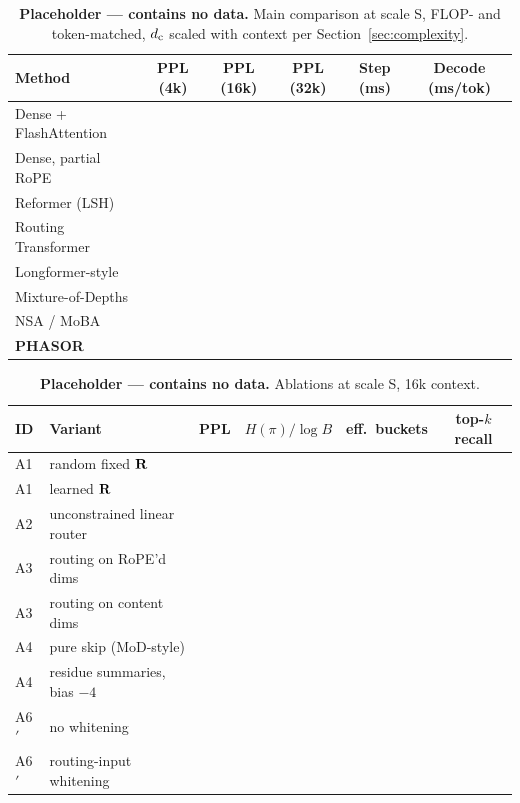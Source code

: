 \begin{table}[h]
\centering
\small
\begin{tabular}{lccccc}
\toprule
\textbf{Method} & \textbf{PPL (4k)} & \textbf{PPL (16k)} & \textbf{PPL (32k)} & \textbf{Step (ms)} & \textbf{Decode (ms/tok)} \\
\midrule
Dense + FlashAttention      & \TODO{--} & \TODO{--} & \TODO{--} & \TODO{--} & \TODO{--} \\
Dense, partial RoPE         & \TODO{--} & \TODO{--} & \TODO{--} & \TODO{--} & \TODO{--} \\
Reformer (LSH)              & \TODO{--} & \TODO{--} & \TODO{--} & \TODO{--} & \TODO{--} \\
Routing Transformer         & \TODO{--} & \TODO{--} & \TODO{--} & \TODO{--} & \TODO{--} \\
Longformer-style            & \TODO{--} & \TODO{--} & \TODO{--} & \TODO{--} & \TODO{--} \\
Mixture-of-Depths           & \TODO{--} & \TODO{--} & \TODO{--} & \TODO{--} & \TODO{--} \\
NSA / MoBA                  & \TODO{--} & \TODO{--} & \TODO{--} & \TODO{--} & \TODO{--} \\
\midrule
\textbf{PHASOR}             & \TODO{--} & \TODO{--} & \TODO{--} & \TODO{--} & \TODO{--} \\
\bottomrule
\end{tabular}
\caption{\textbf{Placeholder --- contains no data.} Main comparison at scale S, FLOP- and token-matched, $d_{\mathrm{c}}$ scaled with context per Section~\ref{sec:complexity}.}
\end{table}

\begin{table}[h]
\centering
\small
\begin{tabular}{llcccc}
\toprule
\textbf{ID} & \textbf{Variant} & \textbf{PPL} & \textbf{$H(\pi)/\log B$} & \textbf{eff.\ buckets} & \textbf{top-$k$ recall} \\
\midrule
A1 & random fixed $\mathbf{R}$              & \TODO{--} & \TODO{--} & \TODO{--} & \TODO{--} \\
A1 & learned $\mathbf{R}$                   & \TODO{--} & \TODO{--} & \TODO{--} & \TODO{--} \\
A2 & unconstrained linear router     & \TODO{--} & \TODO{--} & \TODO{--} & \TODO{--} \\
A3 & routing on RoPE'd dims          & \TODO{--} & \TODO{--} & \TODO{--} & \TODO{--} \\
A3 & routing on content dims         & \TODO{--} & \TODO{--} & \TODO{--} & \TODO{--} \\
A4 & pure skip (MoD-style)           & \TODO{--} & \TODO{--} & \TODO{--} & \TODO{--} \\
A4 & residue summaries, bias $-4$    & \TODO{--} & \TODO{--} & \TODO{--} & \TODO{--} \\
A6$'$ & no whitening                 & \TODO{--} & \TODO{--} & \TODO{--} & \TODO{--} \\
A6$'$ & routing-input whitening      & \TODO{--} & \TODO{--} & \TODO{--} & \TODO{--} \\
\bottomrule
\end{tabular}
\caption{\textbf{Placeholder --- contains no data.} Ablations at scale S, 16k context.}
\end{table}
